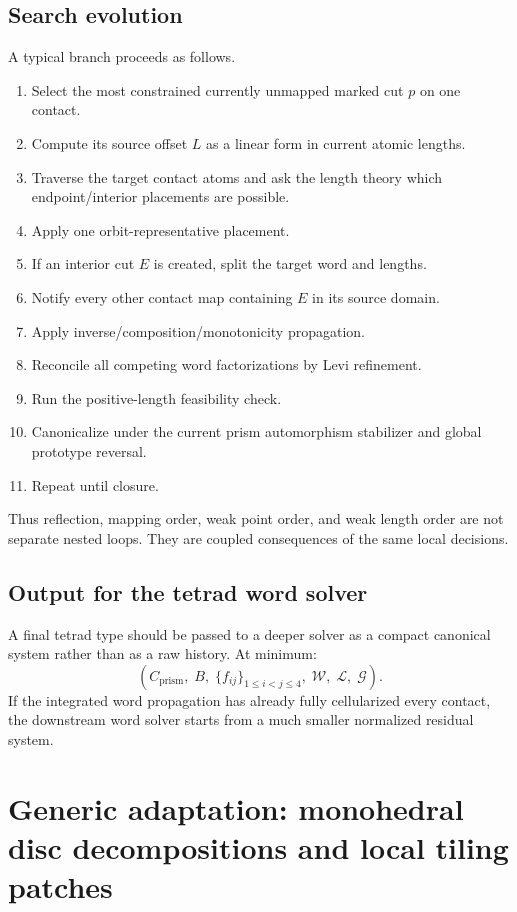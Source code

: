 \documentclass[11pt]{article}
\begin{document}
\subsection{Search evolution}

A typical branch proceeds as follows.
\begin{enumerate}
  \item Select the most constrained currently unmapped marked cut $p$ on one contact.
  \item Compute its source offset $L$ as a linear form in current atomic lengths.
  \item Traverse the target contact atoms and ask the length theory which endpoint/interior placements are possible.
  \item Apply one orbit-representative placement.
  \item If an interior cut $E$ is created, split the target word and lengths.
  \item Notify every other contact map containing $E$ in its source domain.
  \item Apply inverse/composition/monotonicity propagation.
  \item Reconcile all competing word factorizations by Levi refinement.
  \item Run the positive-length feasibility check.
  \item Canonicalize under the current prism automorphism stabilizer and global prototype reversal.
  \item Repeat until closure.
\end{enumerate}

Thus reflection, mapping order, weak point order, and weak length order are not separate nested loops.  They are coupled consequences of the same local decisions.

\subsection{Output for the tetrad word solver}

A final tetrad type should be passed to a deeper solver as a compact canonical system rather than as a raw history.  At minimum:
\[
  \left(C_{\mathrm{prism}},\;B,\;\{f_{ij}\}_{1\le i<j\le4},\;\mathcal W,\;\mathcal L,\;\mathcal G\right).
\]
If the integrated word propagation has already fully cellularized every contact, the downstream word solver starts from a much smaller normalized residual system.

\section{Generic adaptation: monohedral disc decompositions and local tiling patches}
\end{document}
